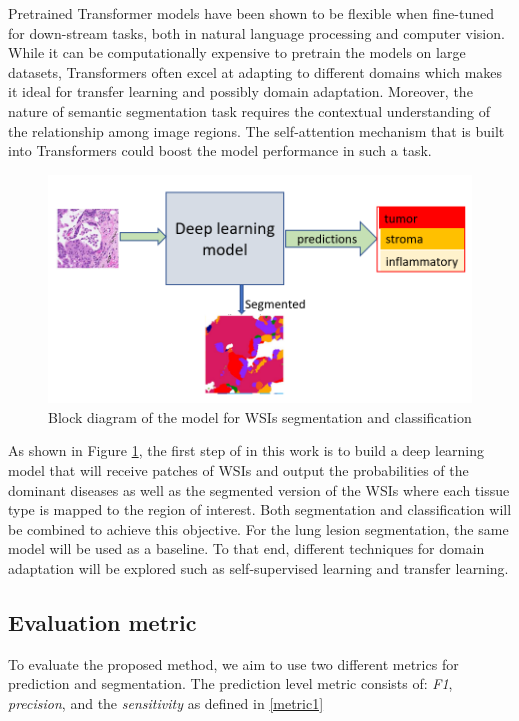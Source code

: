 \documentclass[final]{cvpr}
\begin{document}
Pretrained Transformer models have been shown to be flexible when fine-tuned for down-stream tasks, both in natural language processing and computer vision. While it can be computationally expensive to pretrain the models on large datasets, Transformers often excel at adapting to different domains which makes it ideal for transfer learning and possibly domain adaptation. Moreover, the nature of semantic segmentation task requires the contextual understanding of the relationship among image regions. The self-attention mechanism that is built into Transformers could boost the model performance in such a task.

\begin{figure}[h!]
\begin{center}
   \includegraphics[width=0.8\linewidth]{media/roi1.PNG}
\end{center}
   \caption{Block diagram of the model for WSIs segmentation and classification}
\label{fig:roi}
\end{figure}

As shown in Figure \ref{fig:roi}, the first step of in this work is to build a deep learning model that will receive patches of WSIs and output the probabilities of the dominant diseases as well as the segmented version of the WSIs where each tissue type is mapped to the region of interest. Both segmentation and classification will be combined to achieve this objective. For the lung lesion segmentation, the same model will be used as a baseline. To that end, different techniques for domain adaptation will be explored such as self-supervised learning and transfer learning.

\subsection{Evaluation metric}
To evaluate the proposed method, we aim to use two different metrics for prediction and segmentation. The prediction level metric consists of: \textit{F1}, \textit{precision}, and the \textit{sensitivity} as defined in \ref{metric1}
\end{document}
